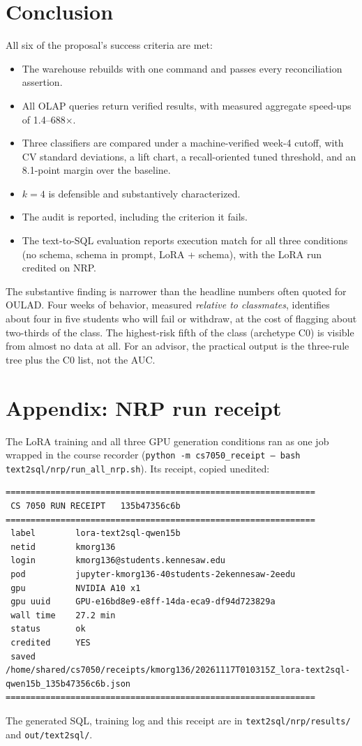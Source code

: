 \documentclass[10pt,letterpaper]{article}
\renewcommand{\tt}[1]{\texttt{#1}}
\begin{document}
\section{Conclusion}
All six of the proposal's success criteria are met:
\begin{itemize}
\item The warehouse rebuilds with one command and passes every reconciliation assertion.
\item All OLAP queries return verified results, with measured aggregate speed-ups of 1.4--688$\times$.
\item Three classifiers are compared under a machine-verified week-4 cutoff, with CV standard deviations, a lift
chart, a recall-oriented tuned threshold, and an 8.1-point margin over the baseline.
\item $k=4$ is defensible and substantively characterized.
\item The audit is reported, including the criterion it fails.
\item The text-to-SQL evaluation reports execution match for all three conditions (no schema, schema in
prompt, LoRA + schema), with the LoRA run credited on NRP.
\end{itemize}
The substantive finding is narrower than the headline numbers often quoted for OULAD. Four weeks of behavior,
measured \emph{relative to classmates}, identifies about four in five students who will fail or withdraw, at the
cost of flagging about two-thirds of the class. The highest-risk fifth of the class (archetype C0) is visible from
almost no data at all. For an advisor, the practical output is the three-rule tree plus the C0 list, not the AUC.

\section*{Appendix: NRP run receipt}\label{app:receipt}
The LoRA training and all three GPU generation conditions ran as one job wrapped in the course recorder
(\tt{python -m cs7050\_receipt -- bash text2sql/nrp/run\_all\_nrp.sh}). Its receipt, copied unedited:
{\scriptsize
\begin{verbatim}
==============================================================
 CS 7050 RUN RECEIPT   135b47356c6b
==============================================================
 label        lora-text2sql-qwen15b
 netid        kmorg136
 login        kmorg136@students.kennesaw.edu
 pod          jupyter-kmorg136-40students-2ekennesaw-2eedu
 gpu          NVIDIA A10 x1
 gpu uuid     GPU-e16bd8e9-e8ff-14da-eca9-df94d723829a
 wall time    27.2 min
 status       ok
 credited     YES
 saved        /home/shared/cs7050/receipts/kmorg136/20261117T010315Z_lora-text2sql-qwen15b_135b47356c6b.json
==============================================================
\end{verbatim}}
The generated SQL, training log and this receipt are in \tt{text2sql/nrp/results/} and \tt{out/text2sql/}.
\end{document}
